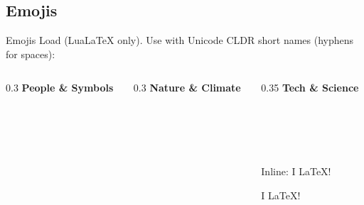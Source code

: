 \documentclass[presentation, aspectratio=169]{beamer}
\begin{document}
\subsection{Emojis}

\begin{frame}[fragile]{Emojis}
  Load  (LuaLaTeX only).
  Use  with Unicode CLDR short names (hyphens for spaces):

  \vspace{0.3em}
  \begin{columns}[t, onlytextwidth]
    \begin{column}{0.3\textwidth}
      \textbf{People \& Symbols}\\[0.3em]
      \\[0.15em]
      \\[0.15em]
      \\[0.15em]
      \\[0.15em]
      \\[0.15em]
    \end{column}
    \begin{column}{0.3\textwidth}
      \textbf{Nature \& Climate}\\[0.3em]
      \\[0.15em]
      \\[0.15em]
      \\[0.15em]
      \\[0.15em]
      \\[0.35em]
    \end{column}
    \begin{column}{0.35\textwidth}
      \textbf{Tech \& Science}\\[0.3em]
      \\[0.15em]
      \\[0.15em]
      \\[0.15em]
      \\[0.15em]
      \\[1.55em]
      {\small Inline: I  \LaTeX\@!}\\[0.3em]
      \begin{codeblock}
I  LaTeX!
      \end{codeblock}
    \end{column}
  \end{columns}
\end{frame}
\end{document}
